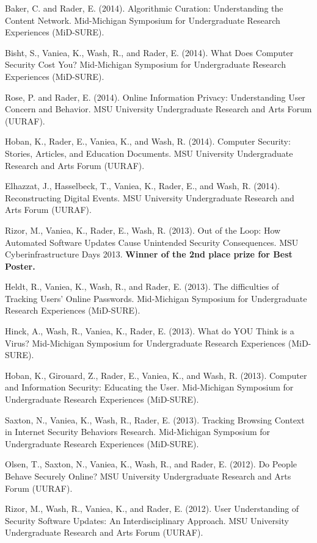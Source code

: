 \documentclass[9pt]{extarticle}
\begin{document}
Baker, C. and Rader, E. (2014). Algorithmic Curation: Understanding the Content Network. Mid-Michigan Symposium for Undergraduate Research Experiences (MiD-SURE).

Bisht, S., Vaniea, K., Wash, R., and Rader, E. (2014). What Does Computer Security Cost You? Mid-Michigan Symposium for Undergraduate Research Experiences (MiD-SURE).

Rose, P. and Rader, E. (2014). Online Information Privacy: Understanding User Concern and Behavior. MSU University Undergraduate Research and Arts Forum (UURAF).

Hoban, K., Rader, E., Vaniea, K., and Wash, R. (2014). Computer Security: Stories, Articles, and Education Documents. MSU University Undergraduate Research and Arts Forum (UURAF).

Elhazzat, J., Hasselbeck, T., Vaniea, K., Rader, E., and Wash, R. (2014). Reconstructing Digital Events. MSU University Undergraduate Research and Arts Forum (UURAF).

Rizor, M., Vaniea, K., Rader, E., Wash, R. (2013). Out of the Loop: How Automated Software Updates Cause Unintended Security Consequences. MSU Cyberinfrastructure Days 2013. \textbf{Winner of the 2nd place prize for Best Poster.}

Heldt, R., Vaniea, K., Wash, R., and Rader, E. (2013). The difficulties of Tracking Users' Online Passwords. Mid-Michigan Symposium for Undergraduate Research Experiences (MiD-SURE). 

Hinck, A., Wash, R., Vaniea, K., Rader, E. (2013). What do YOU Think is a Virus? Mid-Michigan Symposium for Undergraduate Research Experiences (MiD-SURE).

Hoban, K., Girouard, Z., Rader, E., Vaniea, K., and Wash, R. (2013). Computer and Information Security: Educating the User. Mid-Michigan Symposium for Undergraduate Research Experiences (MiD-SURE).

Saxton, N., Vaniea, K., Wash, R., Rader, E. (2013). Tracking Browsing Context in Internet Security Behaviors Research. Mid-Michigan Symposium for Undergraduate Research Experiences (MiD-SURE).

Olsen, T., Saxton, N., Vaniea, K., Wash, R., and Rader, E. (2012). Do People Behave Securely Online? MSU University Undergraduate Research and Arts Forum (UURAF).

Rizor, M., Wash, R., Vaniea, K., and Rader, E. (2012). User Understanding of Security Software Updates: An Interdisciplinary Approach. MSU University Undergraduate Research and Arts Forum (UURAF).
\end{document}
